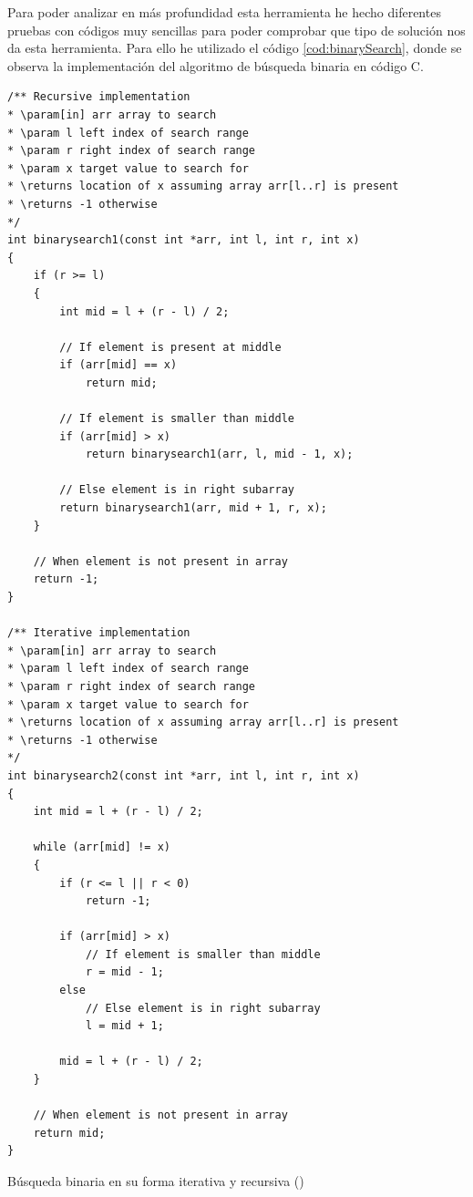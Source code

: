 Para poder analizar en más profundidad esta herramienta he hecho diferentes pruebas
con códigos muy sencillas para poder comprobar que tipo de solución nos da esta
herramienta. Para ello he utilizado el código \ref{cod:binarySearch}, donde se observa
la implementación del algoritmo de búsqueda binaria en código C.

\begin{mycode}
    \begin{verbatim}
/** Recursive implementation
* \param[in] arr array to search
* \param l left index of search range
* \param r right index of search range
* \param x target value to search for
* \returns location of x assuming array arr[l..r] is present
* \returns -1 otherwise
*/
int binarysearch1(const int *arr, int l, int r, int x)
{
    if (r >= l)
    {
        int mid = l + (r - l) / 2;

        // If element is present at middle
        if (arr[mid] == x)
            return mid;

        // If element is smaller than middle
        if (arr[mid] > x)
            return binarysearch1(arr, l, mid - 1, x);

        // Else element is in right subarray
        return binarysearch1(arr, mid + 1, r, x);
    }

    // When element is not present in array
    return -1;
}

/** Iterative implementation
* \param[in] arr array to search
* \param l left index of search range
* \param r right index of search range
* \param x target value to search for
* \returns location of x assuming array arr[l..r] is present
* \returns -1 otherwise
*/
int binarysearch2(const int *arr, int l, int r, int x)
{
    int mid = l + (r - l) / 2;

    while (arr[mid] != x)
    {
        if (r <= l || r < 0)
            return -1;

        if (arr[mid] > x)
            // If element is smaller than middle
            r = mid - 1;
        else
            // Else element is in right subarray
            l = mid + 1;

        mid = l + (r - l) / 2;
    }

    // When element is not present in array
    return mid;
}
    \end{verbatim}
    \caption[Búsqueda binaria en su forma iterativa y recursiva]{Búsqueda binaria en su forma iterativa y recursiva (\cite{BinarySearchGitHub})}
    \label{cod:binarySearch}
\end{mycode}


